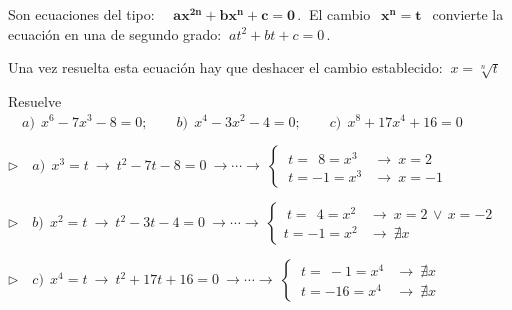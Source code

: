 \begin{definition}

Son ecuaciones del tipo: $\quad \boldsymbol{ax^{2n}+bx^n+c=0}\, . \ $  El  cambio $\ \boxed{\ \boldsymbol{x^n=t} \ } \ $ convierte la ecuación en una de segundo grado: $\ at^2+bt+c=0\, . \ $ 

\vspace{2mm} Una vez resuelta esta ecuación hay que deshacer el cambio establecido: $\ x=\sqrt[n]{t}$
	
\end{definition}


\begin{miejemplo}

Resuelve $\quad a)\ \ x^6-7x^3-8=0;\qquad b)\ \ x^4-3x^2-4=0;\qquad c) \ \ x^8+17x^4+16=0$	

\vspace{5mm} $\triangleright \quad a)\ \ x^3=t \ \to \ t^2-7t-8=0 \ \to \cdots \to \ \begin{cases}
	\ t=\ \ 8=x^3 & \to \ x=2 \\ \ t=-1=x^3 & \to \ x=-1 \end{cases}$

\vspace{5mm} $\triangleright \quad b)\ \ x^2=t \ \to \ t^2-3t-4=0 \ \to \cdots \to \ \begin{cases}
 \ t=\ \ 4=x^2 	 & \to \ x=2 \, \vee \, x=-2 \\ t=-1=x^2 & \to \ \nexists x
 \end{cases}$

\vspace{5mm} $\triangleright \quad c)\ \ x^4=t \ \to \ t^2+17t+16 = 0 \ \to \cdots \to \ \begin{cases} \ t=\ -1=x^4 & \to \ \nexists x \\ \ t=-16= x^4 &\to \ \nexists x \end{cases}$
\end{miejemplo}

